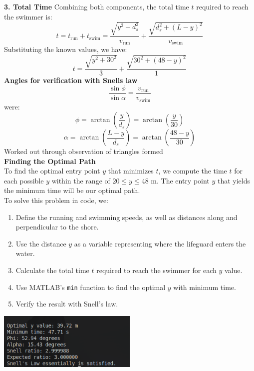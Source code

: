 \documentclass[a4paper, 12pt]{report}
\def\link{blue!50!black}
\begin{document}
    
    \textbf{3. Total Time} Combining both components, the total time \( t \) required to reach the swimmer is:
    \[ t = t_{\text{run}} + t_{\text{swim}} = \frac{\sqrt{y^2 + d_s^2}}{v_{\text{run}}} + \frac{\sqrt{d_s^2 + (L - y)^2}}{v_{\text{swim}}} \]
    Substituting the known values, we have:
    \[ t = \frac{\sqrt{y^2 + 30^2}}{3} + \frac{\sqrt{30^2 + (48 - y)^2}}{1} \]
    \textbf{Angles for verification with Snells law}
    \[\frac{\sin \phi}{\sin \alpha} = \frac{v_{\text{run}}}{v_{\text{swim}}}\]
    were:
    \[\phi = \arctan\left(\frac{y}{d_s}\right) = \arctan\left(\frac{y}{30}\right)\]
    \[\alpha = \arctan\left(\frac{L-y}{d_s}\right) = \arctan\left(\frac{48-y}{30}\right)\]
    Worked out through observation of triangles formed\\[1em]
    \textbf{Finding the Optimal Path}\\[8pt]
    To find the optimal entry point \( y \) that minimizes \( t \), we compute the time \( t \) for each possible \( y \) within the range of \( 20 \leq y \leq 48 \) m. The entry point \( y \) that yields the minimum time will be our optimal path.\\[1em]
    To solve this problem in code, we:
    \begin{enumerate}[itemsep=-0.1cm]
        \item Define the running and swimming speeds, as well as distances along and perpendicular to the shore.
        \item Use the distance \( y \) as a variable representing where the lifeguard enters the water.
        \item Calculate the total time \( t \) required to reach the swimmer for each \( y \) value.
        \item Use MATLAB’s \texttt{min} function to find the optimal \( y \) with minimum time.
        \item Verify the result with Snell's law.
    \end{enumerate}
    
    
    \includegraphics[width=0.5\textwidth]{images/q7.png}
\end{document}
